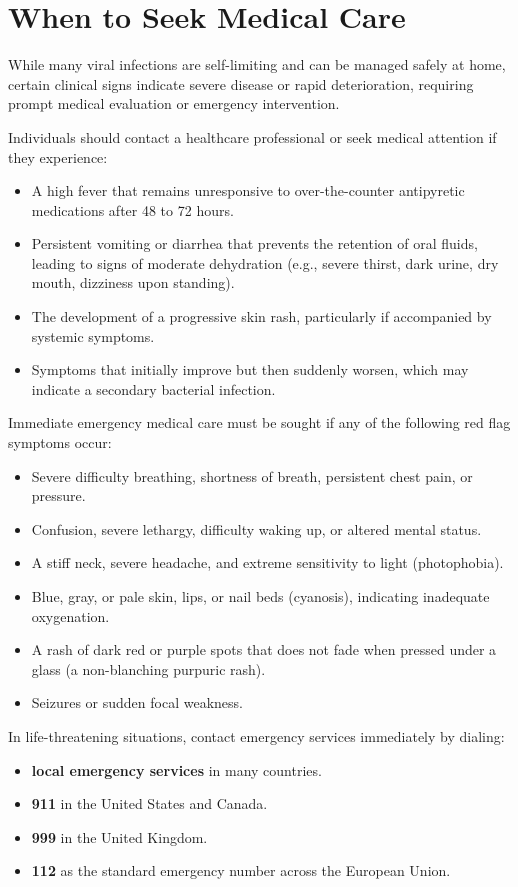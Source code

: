 \section*{When to Seek Medical Care}
While many viral infections are self-limiting and can be managed safely at home, certain clinical signs indicate severe disease or rapid deterioration, requiring prompt medical evaluation or emergency intervention.

Individuals should contact a healthcare professional or seek medical attention if they experience:
\begin{itemize}
    \item A high fever that remains unresponsive to over-the-counter antipyretic medications after 48 to 72 hours.
    \item Persistent vomiting or diarrhea that prevents the retention of oral fluids, leading to signs of moderate dehydration (e.g., severe thirst, dark urine, dry mouth, dizziness upon standing).
    \item The development of a progressive skin rash, particularly if accompanied by systemic symptoms.
    \item Symptoms that initially improve but then suddenly worsen, which may indicate a secondary bacterial infection.
\end{itemize}

Immediate emergency medical care must be sought if any of the following red flag symptoms occur:
\begin{itemize}
    \item Severe difficulty breathing, shortness of breath, persistent chest pain, or pressure.
    \item Confusion, severe lethargy, difficulty waking up, or altered mental status.
    \item A stiff neck, severe headache, and extreme sensitivity to light (photophobia).
    \item Blue, gray, or pale skin, lips, or nail beds (cyanosis), indicating inadequate oxygenation.
    \item A rash of dark red or purple spots that does not fade when pressed under a glass (a non-blanching purpuric rash).
    \item Seizures or sudden focal weakness.
\end{itemize}

In life-threatening situations, contact emergency services immediately by dialing:
\begin{itemize}
    \item \textbf{local emergency services} in many countries.
    \item \textbf{911} in the United States and Canada.
    \item \textbf{999} in the United Kingdom.
    \item \textbf{112} as the standard emergency number across the European Union.
\end{itemize}

